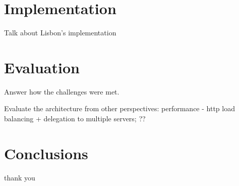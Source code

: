 \documentclass[times]{ettauth}
\begin{document}
\section{Implementation}
Talk about Lisbon's implementation



\section{Evaluation}
Answer how the challenges were met.

Evaluate the architecture from other perspectives: performance - http load balancing + delegation to multiple servers; ??



\section{Conclusions}


\acks
thank you



\end{document}
